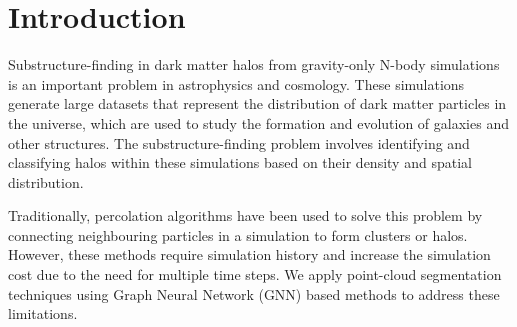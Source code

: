 \section{Introduction}

    Substructure-finding in dark matter halos from gravity-only N-body simulations is an important problem in astrophysics and cosmology. These simulations generate large datasets that represent the distribution of dark matter particles in the universe, which are used to study the formation and evolution of galaxies and other structures. The substructure-finding problem involves identifying and classifying halos within these simulations based on their density and spatial distribution.
    
    Traditionally, percolation algorithms have been used to solve this problem by connecting neighbouring particles in a simulation to form clusters or halos. However, these methods require simulation history and increase the simulation cost due to the need for multiple time steps. We apply point-cloud segmentation techniques using Graph Neural Network (GNN) based methods to address these limitations.
